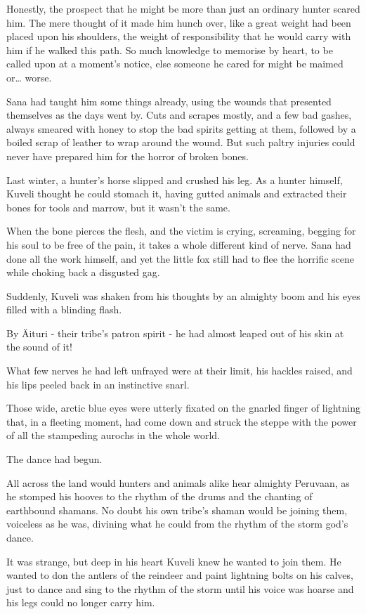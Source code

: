 Honestly, the prospect that he might be more than just an ordinary hunter scared him. The mere thought of it made him hunch over, like a great weight had been placed upon his shoulders, the weight of responsibility that he would carry with him if he walked this path. So much knowledge to memorise by heart, to be called upon at a moment's notice, else someone he cared for might be maimed or\ldots{} worse.

Sana had taught him some things already, using the wounds that presented themselves as the days went by. Cuts and scrapes mostly, and a few bad gashes, always smeared with honey to stop the bad spirits getting at them, followed by a boiled scrap of leather to wrap around the wound. But such paltry injuries could never have prepared him for the horror of broken bones.

Last winter, a hunter's horse slipped and crushed his leg. As a hunter himself, Kuveli thought he could stomach it, having gutted animals and extracted their bones for tools and marrow, but it wasn't the same.

When the bone pierces the flesh, and the victim is crying, screaming, begging for his soul to be free of the pain, it takes a whole different kind of nerve. Sana had done all the work himself, and yet the little fox still had to flee the horrific scene while choking back a disgusted gag.

Suddenly, Kuveli was shaken from his thoughts by an almighty boom and his eyes filled with a blinding flash.

By Äituri - their tribe's patron spirit - he had almost leaped out of his skin at the sound of it!

What few nerves he had left unfrayed were at their limit, his hackles raised, and his lips peeled back in an instinctive snarl.

Those wide, arctic blue eyes were utterly fixated on the gnarled finger of lightning that, in a fleeting moment, had come down and struck the steppe with the power of all the stampeding aurochs in the whole world.

The dance had begun.

All across the land would hunters and animals alike hear almighty Peruvaan, as he stomped his hooves to the rhythm of the drums and the chanting of earthbound shamans. No doubt his own tribe's shaman would be joining them, voiceless as he was, divining what he could from the rhythm of the storm god's dance.

It was strange, but deep in his heart Kuveli knew he wanted to join them. He wanted to don the antlers of the reindeer and paint lightning bolts on his calves, just to dance and sing to the rhythm of the storm until his voice was hoarse and his legs could no longer carry him.

